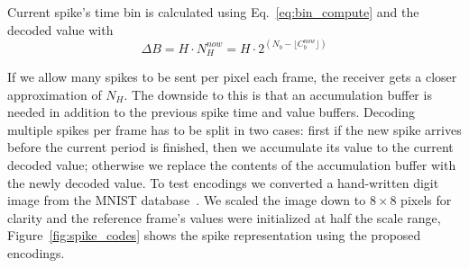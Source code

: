 \documentclass[conference]{IEEEtran}
\begin{document}
Current spike's time bin is calculated using Eq.~\ref{eq:bin_compute} and the decoded value with
\begin{equation}
\Delta B = H\cdot N_{H}^{now} = H\cdot 2^{ \left( N_{b} - \lfloor C^{now}_{b}\rfloor  \right)}
\label{eq:new_Nh_exp}
\end{equation}

If we allow many spikes to be sent per pixel each frame, the receiver gets a closer approximation of $N_{H}$. The downside to this is that an accumulation buffer is needed in addition to the previous spike time and value buffers. Decoding multiple spikes per frame has to be split in two cases: first if the new spike arrives before the current period is finished, then we accumulate its value to the current decoded value; otherwise we replace the contents of the accumulation buffer with the newly decoded value. To test encodings we converted a hand-written digit image from the MNIST database~\cite{mnist}. We scaled the image down to $8\times8$ pixels for clarity and the reference frame's values were initialized at half the scale range, Figure~\ref{fig:spike_codes} shows the spike representation using the proposed encodings.
\end{document}
